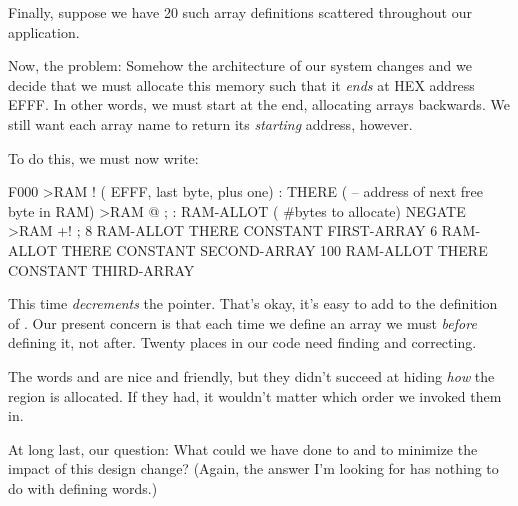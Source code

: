 Finally, suppose we have 20 such array definitions scattered
throughout our application.

Now, the problem: Somehow the architecture of our system changes and
we decide that we must allocate this memory such that it \emph{ends}
at HEX address EFFF. In other words, we must start at the end,
allocating arrays backwards. We still want each array name to return
its \emph{starting} address, however.

To do this, we must now write:

\begin{Code}
F000 >RAM ! ( EFFF, last byte, plus one)
: THERE ( -- address of next free byte in RAM)
     >RAM @ ;
: RAM-ALLOT  ( #bytes to allocate)  NEGATE >RAM +! ;
  8 RAM-ALLOT  THERE CONSTANT FIRST-ARRAY
  6 RAM-ALLOT  THERE CONSTANT SECOND-ARRAY
100 RAM-ALLOT  THERE CONSTANT THIRD-ARRAY
\end{Code}

This time  \emph{decrements} the pointer. That's
okay, it's easy to add  to the definition of
. Our present concern is that each time we define an
array we must  \emph{before} defining it, not after. Twenty
places in our code need finding and correcting.

The words  and  are nice and friendly,
but they didn't succeed at hiding \emph{how} the region is
allocated. If they had, it wouldn't matter which order we invoked them
in.

At long last, our question: What could we have done to  and
 to minimize the impact of this design change? (Again, the
answer I'm looking for has nothing to do with defining words.)


